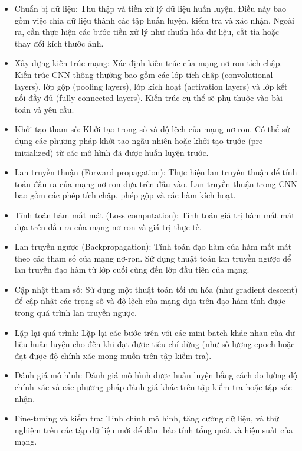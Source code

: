 \begin{itemize}
    \item Chuẩn bị dữ liệu: Thu thập và tiền xử lý dữ liệu huấn luyện. Điều này bao gồm việc chia dữ liệu thành các tập huấn luyện, kiểm tra và xác nhận. Ngoài ra, cần thực hiện các bước tiền xử lý như chuẩn hóa dữ liệu, cắt tỉa hoặc thay đổi kích thước ảnh.
    \item Xây dựng kiến trúc mạng: Xác định kiến trúc của mạng nơ-ron tích chập. Kiến trúc CNN thông thường bao gồm các lớp tích chập (convolutional layers), lớp gộp (pooling layers), lớp kích hoạt (activation layers) và lớp kết nối đầy đủ (fully connected layers). Kiến trúc cụ thể sẽ phụ thuộc vào bài toán và yêu cầu.
    \item Khởi tạo tham số: Khởi tạo trọng số và độ lệch của mạng nơ-ron. Có thể sử dụng các phương pháp khởi tạo ngẫu nhiên hoặc khởi tạo trước (pre-initialized) từ các mô hình đã được huấn luyện trước.
    \item Lan truyền thuận (Forward propagation): Thực hiện lan truyền thuận để tính toán đầu ra của mạng nơ-ron dựa trên đầu vào. Lan truyền thuận trong CNN bao gồm các phép tích chập, phép gộp và các hàm kích hoạt.
    \item Tính toán hàm mất mát (Loss computation): Tính toán giá trị hàm mất mát dựa trên đầu ra của mạng nơ-ron và giá trị thực tế.
    \item Lan truyền ngược (Backpropagation): Tính toán đạo hàm của hàm mất mát theo các tham số của mạng nơ-ron. Sử dụng thuật toán lan truyền ngược để lan truyền đạo hàm từ lớp cuối cùng đến lớp đầu tiên của mạng.
    \item Cập nhật tham số: Sử dụng một thuật toán tối ưu hóa (như gradient descent) để cập nhật các trọng số và độ lệch của mạng dựa trên đạo hàm tính được trong quá trình lan truyền ngược.
    \item Lặp lại quá trình: Lặp lại các bước trên với các mini-batch khác nhau của dữ liệu huấn luyện cho đến khi đạt được tiêu chí dừng (như số lượng epoch hoặc đạt được độ chính xác mong muốn trên tập kiểm tra).
    \item Đánh giá mô hình: Đánh giá mô hình được huấn luyện bằng cách đo lường độ chính xác và các phương pháp đánh giá khác trên tập kiểm tra hoặc tập xác nhận.
    \item Fine-tuning và kiểm tra: Tinh chỉnh mô hình, tăng cường dữ liệu, và thử nghiệm trên các tập dữ liệu mới để đảm bảo tính tổng quát và hiệu suất của mạng.
\end{itemize}

